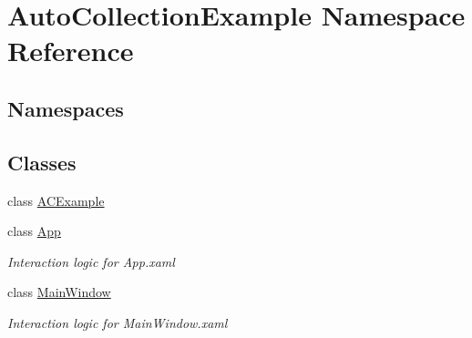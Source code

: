 \hypertarget{namespace_auto_collection_example}{}\section{Auto\+Collection\+Example Namespace Reference}
\label{namespace_auto_collection_example}
\subsection*{Namespaces}
\begin{DoxyCompactItemize}
\end{DoxyCompactItemize}
\subsection*{Classes}
\begin{DoxyCompactItemize}
\item 
class \mbox{\hyperlink{class_auto_collection_example_1_1_a_c_example}{A\+C\+Example}}
\item 
class \mbox{\hyperlink{class_auto_collection_example_1_1_app}{App}}
\begin{DoxyCompactList}\small\item\em Interaction logic for App.\+xaml \end{DoxyCompactList}\item 
class \mbox{\hyperlink{class_auto_collection_example_1_1_main_window}{Main\+Window}}
\begin{DoxyCompactList}\small\item\em Interaction logic for Main\+Window.\+xaml \end{DoxyCompactList}\end{DoxyCompactItemize}
